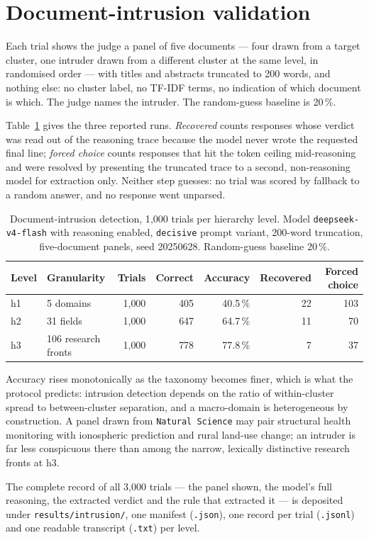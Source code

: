 \documentclass[a4paper,10pt]{article}
\begin{document}


\section{Document-intrusion validation}

Each trial shows the judge a panel of five documents --- four drawn from a
target cluster, one intruder drawn from a different cluster at the same level,
in randomised order --- with titles and abstracts truncated to 200 words, and
nothing else: no cluster label, no TF-IDF terms, no indication of which
document is which. The judge names the intruder. The random-guess baseline is
20\,\%.

Table~\ref{tab:s4} gives the three reported runs. \textit{Recovered} counts
responses whose verdict was read out of the reasoning trace because the model
never wrote the requested final line; \textit{forced choice} counts responses
that hit the token ceiling mid-reasoning and were resolved by presenting the
truncated trace to a second, non-reasoning model for extraction only. Neither
step guesses: no trial was scored by fallback to a random answer, and no
response went unparsed.

\begin{table}[h]
\centering
\begin{tabular}{@{}l l r r r r r@{}}
\toprule
\textbf{Level} & \textbf{Granularity} & \textbf{Trials} & \textbf{Correct} & \textbf{Accuracy} & \textbf{Recovered} & \textbf{Forced choice} \\
\midrule
h1 & 5 domains           & 1{,}000 & 405 & 40.5\,\% & 22 & 103 \\
h2 & 31 fields           & 1{,}000 & 647 & 64.7\,\% & 11 & 70 \\
h3 & 106 research fronts & 1{,}000 & 778 & 77.8\,\% & 7  & 37 \\
\bottomrule
\end{tabular}
\caption{Document-intrusion detection, 1{,}000 trials per hierarchy level.
Model \texttt{deepseek-v4-flash} with reasoning enabled, \texttt{decisive}
prompt variant, 200-word truncation, five-document panels, seed 20250628.
Random-guess baseline 20\,\%.}
\label{tab:s4}
\end{table}

Accuracy rises monotonically as the taxonomy becomes finer, which is what the
protocol predicts: intrusion detection depends on the ratio of within-cluster
spread to between-cluster separation, and a macro-domain is heterogeneous by
construction. A panel drawn from \texttt{Natural Science} may pair structural
health monitoring with ionospheric prediction and rural land-use change; an
intruder is far less conspicuous there than among the narrow, lexically
distinctive research fronts at h3.

The complete record of all 3{,}000 trials --- the panel shown, the model's full
reasoning, the extracted verdict and the rule that extracted it --- is deposited
under \texttt{results/intrusion/}, one manifest (\texttt{.json}), one record per
trial (\texttt{.jsonl}) and one readable transcript (\texttt{.txt}) per level.
\end{document}
